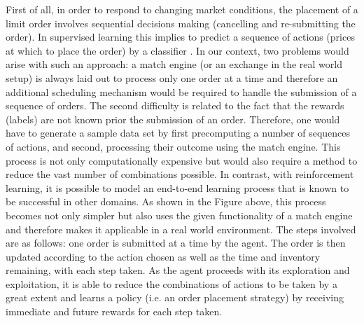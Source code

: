     First of all, in order to respond to changing market conditions, the placement of a limit order involves sequential decisions making (cancelling and re-submitting the order). 
    In supervised learning this implies to predict a sequence of actions (prices at which to place the order) by a classifier \cite{sequence-prediction}.
    In our context, two problems would arise with such an approach:
    a match engine (or an exchange in the real world setup) is always laid out to process only one order at a time and therefore an additional scheduling mechanism would be required to handle the submission of a sequence of orders.
    The second difficulty is related to the fact that the rewards (labels) are not known prior the submission of an order.
    Therefore, one would have to generate a sample data set by first precomputing a number of sequences of actions, and second, processing their outcome using the match engine.
    This process is not only computationally expensive but would also require a method to reduce the vast number of combinations possible.
    In contrast, with reinforcement learning, it is possible to model an end-to-end learning process that is known to be successful in other domains\cite{amodei2016deep, mnih2015human, mnih2013playing}.
    As shown in the Figure above, this process becomes not only simpler but also uses the given functionality of a match engine and therefore makes it applicable in a real world environment.
    The steps involved are as follows: one order is submitted at a time by the agent.
    The order is then updated according to the action chosen as well as the time and inventory remaining, with each step taken.
    As the agent proceeds with its exploration and exploitation, it is able to reduce the combinations of actions to be taken by a great extent and learns a policy (i.e. an order placement strategy) by receiving immediate and future rewards for each step taken.
    

